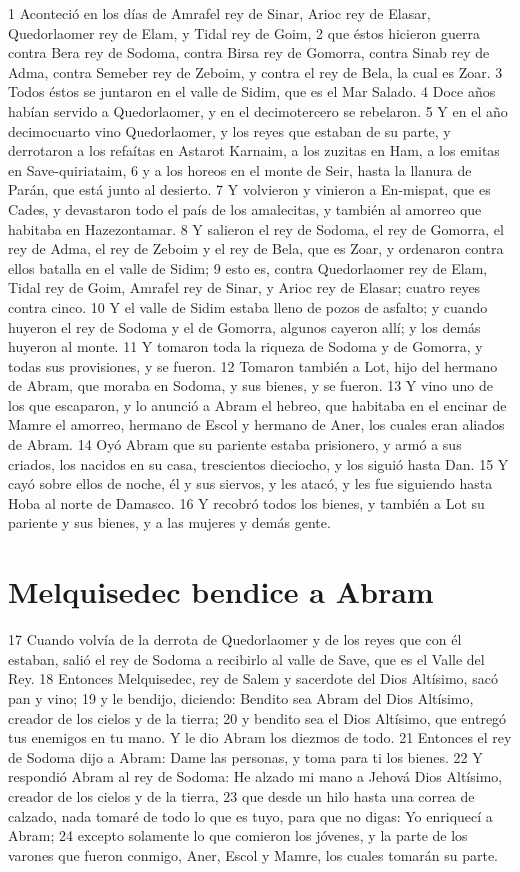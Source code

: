 1 Aconteció en los días de Amrafel rey de Sinar, Arioc rey de Elasar, Quedorlaomer rey de Elam, y Tidal rey de Goim,
2 que éstos hicieron guerra contra Bera rey de Sodoma, contra Birsa rey de Gomorra, contra Sinab rey de Adma, contra Semeber rey de Zeboim, y contra el rey de Bela, la cual es Zoar.
3 Todos éstos se juntaron en el valle de Sidim, que es el Mar Salado.
4 Doce años habían servido a Quedorlaomer, y en el decimotercero se rebelaron.
5 Y en el año decimocuarto vino Quedorlaomer, y los reyes que estaban de su parte, y derrotaron a los refaítas en Astarot Karnaim, a los zuzitas en Ham, a los emitas en Save-quiriataim,
6 y a los horeos en el monte de Seir, hasta la llanura de Parán, que está junto al desierto.
7 Y volvieron y vinieron a En-mispat, que es Cades, y devastaron todo el país de los amalecitas, y también al amorreo que habitaba en Hazezontamar.
8 Y salieron el rey de Sodoma, el rey de Gomorra, el rey de Adma, el rey de Zeboim y el rey de Bela, que es Zoar, y ordenaron contra ellos batalla en el valle de Sidim;
9 esto es, contra Quedorlaomer rey de Elam, Tidal rey de Goim, Amrafel rey de Sinar, y Arioc rey de Elasar; cuatro reyes contra cinco.
10 Y el valle de Sidim estaba lleno de pozos de asfalto; y cuando huyeron el rey de Sodoma y el de Gomorra, algunos cayeron allí; y los demás huyeron al monte.
11 Y tomaron toda la riqueza de Sodoma y de Gomorra, y todas sus provisiones, y se fueron.
12 Tomaron también a Lot, hijo del hermano de Abram, que moraba en Sodoma, y sus bienes, y se fueron.
13 Y vino uno de los que escaparon, y lo anunció a Abram el hebreo, que habitaba en el encinar de Mamre el amorreo, hermano de Escol y hermano de Aner, los cuales eran aliados de Abram.
14 Oyó Abram que su pariente estaba prisionero, y armó a sus criados, los nacidos en su casa, trescientos dieciocho, y los siguió hasta Dan.
15 Y cayó sobre ellos de noche, él y sus siervos, y les atacó, y les fue siguiendo hasta Hoba al norte de Damasco.
16 Y recobró todos los bienes, y también a Lot su pariente y sus bienes, y a las mujeres y demás gente.

\section*{Melquisedec bendice a Abram}

17 Cuando volvía de la derrota de Quedorlaomer y de los reyes que con él estaban, salió el rey de Sodoma a recibirlo al valle de Save, que es el Valle del Rey.
18 Entonces Melquisedec, rey de Salem y sacerdote del Dios Altísimo, sacó pan y vino;
19 y le bendijo, diciendo: Bendito sea Abram del Dios Altísimo, creador de los cielos y de la tierra;
20 y bendito sea el Dios Altísimo, que entregó tus enemigos en tu mano. Y le dio Abram los diezmos de todo.
21 Entonces el rey de Sodoma dijo a Abram: Dame las personas, y toma para ti los bienes.
22 Y respondió Abram al rey de Sodoma: He alzado mi mano a Jehová Dios Altísimo, creador de los cielos y de la tierra,
23 que desde un hilo hasta una correa de calzado, nada tomaré de todo lo que es tuyo, para que no digas: Yo enriquecí a Abram;
24 excepto solamente lo que comieron los jóvenes, y la parte de los varones que fueron conmigo, Aner, Escol y Mamre, los cuales tomarán su parte.

